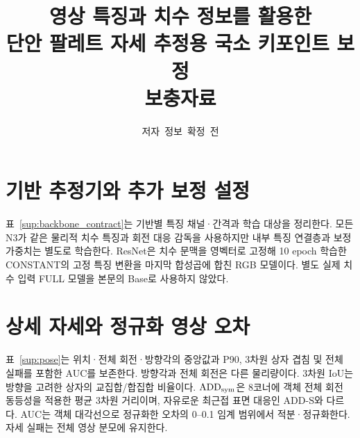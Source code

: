 \documentclass[journal,twoside,web]{ieeecolor}
\begin{document}
\renewcommand{\thetable}{S\Roman{table}}
\renewcommand{\thefigure}{S\arabic{figure}}
\title{영상 특징과 치수 정보를 활용한\\단안 팔레트 자세 추정용 국소 키포인트 보정\\보충자료}
\author{\mbox{저자 정보 확정 전}}
\maketitle
\section{기반 추정기와 추가 보정 설정}
표~\ref{sup:backbone_contract}는 기반별 특징 채널·간격과 학습 대상을 정리한다. 모든 N3가 같은 물리적 치수 특징과 회전 대응 감독을 사용하지만 내부 특징 연결층과 보정 가중치는 별도로 학습한다. ResNet은 치수 문맥을 영벡터로 고정해 10 epoch 학습한 CONSTANT의 고정 특징 변환을 마지막 합성곱에 합친 RGB 모델이다. 별도 실제 치수 입력 FULL 모델을 본문의 Base로 사용하지 않았다.


\section{상세 자세와 정규화 영상 오차}
표~\ref{sup:pose}는 위치·전체 회전·방향각의 중앙값과 P90, 3차원 상자 겹침 및 전체 실패를 포함한 AUC를 보존한다. 방향각과 전체 회전은 다른 물리량이다. 3차원 IoU는 방향을 고려한 상자의 교집합/합집합 비율이다. $\mathrm{ADD}_{\rm sym}$은 8코너에 객체 전체 회전 동등성을 적용한 평균 3차원 거리이며, 자유로운 최근접 표면 대응인 ADD-S와 다르다. AUC는 객체 대각선으로 정규화한 오차의 0--0.1 임계 범위에서 적분·정규화한다. 자세 실패는 전체 영상 분모에 유지한다.

\end{document}
